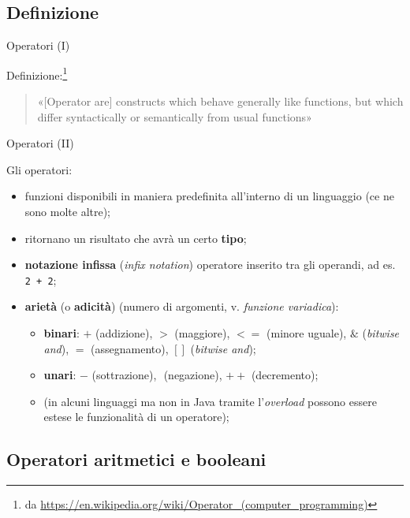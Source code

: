\subsection[Definizione]{Definizione}


\begin{frame}{Operatori (I)}
  
  Definizione:\footnote{da \url{https://en.wikipedia.org/wiki/Operator_(computer_programming)}}
  \begin{quote}
    «[Operator are] constructs which behave generally like functions, but which differ syntactically 
      or semantically from usual functions»
  \end{quote}
\end{frame}

\begin{frame}{Operatori (II)}

  Gli operatori:
  \begin{itemize}
    \item funzioni disponibili in maniera predefinita all'interno di un linguaggio (ce ne sono molte altre);
    \item ritornano un risultato che avrà un certo \textbf{tipo};
    \item \textbf{notazione infissa} (\emph{infix notation}) operatore inserito tra gli operandi, ad es. \texttt{2 + 2};
    \item \textbf{arietà} (o \textbf{adicità}) (numero di argomenti, v. \emph{funzione variadica}):
      \begin{itemize}
	\item \textbf{binari}: \texttt{$+$} (addizione), \texttt{$>$} (maggiore), \texttt{$<=$} (minore uguale),
	      \texttt{$\&$} (\emph{bitwise and}), \texttt{$=$} (assegnamento), \texttt{$[]$} (\emph{bitwise and});
	\item \textbf{unari}: \texttt{$-$} (sottrazione), \texttt{$\!$} (negazione), \texttt{$++$} (decremento);
	\item (in alcuni linguaggi \alert{ma non in Java} tramite l'\emph{overload} possono essere estese le funzionalità
	      di un operatore);
      \end{itemize}  
  \end{itemize}
\end{frame}

\subsection[Operatori aritmetici]{Operatori aritmetici e booleani}

